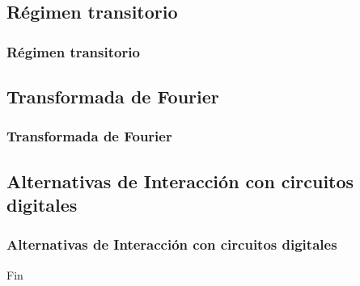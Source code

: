 \documentclass{beamer}
\begin{document}
\subsection{Régimen transitorio}
\begin{frame}
\frametitle{Régimen transitorio}
\end{frame}
\subsection{Transformada de Fourier}
\begin{frame}
\frametitle{Transformada de Fourier}
\end{frame}
\subsection{Alternativas de Interacción con circuitos digitales}
\begin{frame}
\frametitle{Alternativas de Interacción con circuitos digitales}
\end{frame}

\begin{frame}
\Huge{\centerline{Fin}}
\end{frame}

\end{document}
